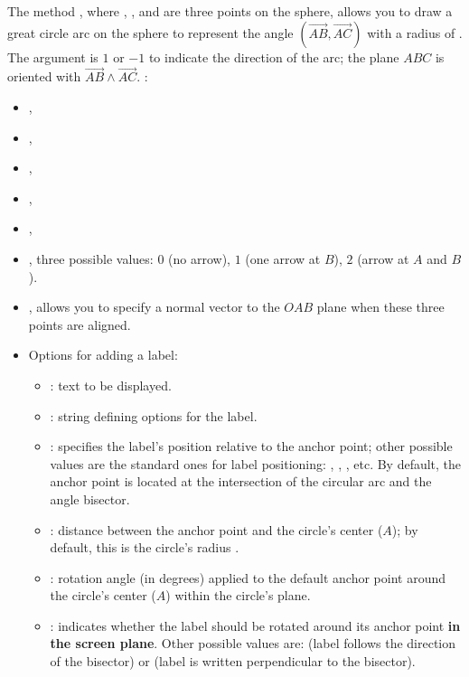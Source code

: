 The method , where , , and  are three points on the sphere, allows you to draw a great circle arc on the sphere to represent the angle $(\vec{AB},\vec{AC})$ with a radius of . The argument  is $1$ or $-1$ to indicate the direction of the arc; the plane $ABC$ is oriented with $\vec{AB}\wedge\vec{AC}$. \writeoptions:
\begin{itemize}
    \item {},
    \item {},
    \item {},
    \item {},
    \item {},
    \item {}, three possible values: $0$ (no arrow), $1$ (one arrow at $B$), $2$ (arrow at $A$ and $B$).
    \item {}, allows you to specify a normal vector to the $OAB$ plane when these three points are aligned.
    \item Options for adding a label:
    \begin{itemize}
        \item {} : text to be displayed. 
        
        \item {} : string defining options for the label.
        
        \item {} : specifies the label's position relative to the anchor point; other possible values ​​are the standard ones for label positioning: , , , etc. By default, the anchor point is located at the intersection of the circular arc and the angle bisector. 
        
        \item {} : distance between the anchor point and the circle's center ($A$); by default, this is the circle's radius . 
        
        \item {} : rotation angle (in degrees) applied to the default anchor point around the circle's center ($A$) within the circle's plane. 
        
        \item {} : indicates whether the label should be rotated around its anchor point \textbf{in the screen plane}. Other possible values ​​are:  (label follows the direction of the bisector) or  (label is written perpendicular to the bisector). 
        

\end{itemize}
\end{itemize}
